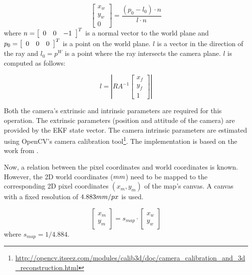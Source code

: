 \begin{equation}
\left[ {
\begin{array}{c} x_w \\ y_w \\ 0 \end{array}
} \right]
 = \frac{(p_0 - l_0) \cdot n}{l \cdot n}
\end{equation}
where $n = \left[ {  \begin{array}{l l l} 0 & 0 & -1 \end{array}  } \right]^T$ is a normal vector to the world plane and $p_0 = \left[ {  \begin{array}{l l l} 0 & 0 & 0 \end{array}  } \right]^T$ is a point on the world plane.
$l$ is a vector in the direction of the ray and $l_0 = p^W$ is a point where the ray intersects the camera plane.
$l$ is computed as follows:

\begin{equation}
l = 
\left|
R
A^{-1}
\left[ {
\begin{array}{c} x_f \\ y_f \\ 1 \end{array}
} \right]
\right|
\end{equation}

Both the camera's extrinsic and intrinsic parameters are required for this operation.
The extrinsic parameters (position and attitude of the camera) are provided by the EKF state vector.
The camera intrinsic parameters are estimated using OpenCV's camera calibration tool\footnote{\url{http://opencv.itseez.com/modules/calib3d/doc/camera_calibration_and_3d_reconstruction.html}}. The implementation is based on the work from \cite{Zhang2000, Bouguet1999}.


Now, a relation between the pixel coordinates and world coordinates is known.
However, the 2D world coordinates ($\small{mm}$) need to be mapped to the corresponding 2D pixel coordinates $(x_m, y_m)$ of the map's canvas.
A canvas with a fixed resolution of $4.883\small{mm/px}$ is used.

\begin{equation}
\left[ {
\begin{array}{c} x_{m} \\ y_{m} \end{array}
} \right]
= s_{map} \cdot
\left[ {
\begin{array}{c} x_{w} \\ y_{w} \end{array}
} \right]
\end{equation}
where $s_{map} = 1 / 4.884$.


